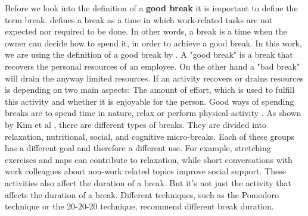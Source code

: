 \documentclass{hasel_thesis}
\begin{document}







Before we look into the definition of a \textbf{good break} it is important to define the term break. \cite{Trougakos.2009} defines a break as a time in which work-related tasks are not expected nor required to be done. In other words, a break is a time when the owner can decide how to spend it, in order to achieve a good break. In this work, we are using the definition of a good break by \cite{Trougakos.2009}. A "good break" is a break that recovers the personal resources of an employee. On the other hand a "bad break" will drain the anyway limited resources. If an activity recovers or drains resources is depending on two main aspects: The amount of effort, which is used to fulfill this activity and whether it is enjoyable for the person. Good ways of spending breaks are to spend time in nature, relax or perform physical activity \cite{Bloom.2014} \cite{Largo-Wight.2017}.  As shown by Kim et al \cite{KimS.ParkY.&Niu.2017}, there are different types of breaks. They are divided into relaxation, nutritional, social, and cognitive micro-breaks. Each of these groups has a different goal and therefore a different use. For example, stretching exercises and naps can contribute to relaxation, while short conversations with work colleagues about non-work related topics improve social support. These activities also affect the duration of a break. But it's not just the activity that affects the duration of a break. Different techniques, such as the Pomodoro technique or the 20-20-20 technique, recommend different break duration.
\end{document}

